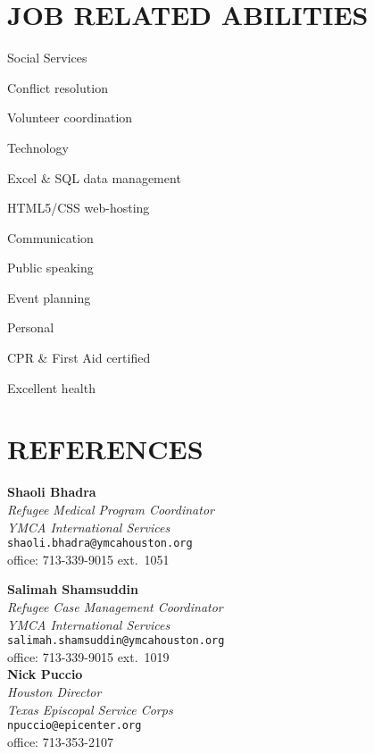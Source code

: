 \documentclass[margin]{res}
\newcommand\reference[5]{\textbf{#1}\\\emph{#2}\\#5\\#3\\}
\begin{document}
\begin{resume}
\section{JOB RELATED ABILITIES} \vspace{0pt}
	\begin{multicols}{2}
		\parskip=0pt
		\begin{skill}{Social Services}
			\item Conflict resolution
			\item Volunteer coordination
		\end{skill}
		\begin{skill}{Technology}
			\item Excel \& SQL data management
			\item HTML5/CSS web-hosting
		\end{skill}
		\begin{skill}{Communication}
			\item Public speaking
			\item Event planning
		\end{skill}
		\begin{skill}{Personal}
			\item CPR \& First Aid certified
			\item Excellent health
		\end{skill}
	\end{multicols}

\section{REFERENCES} 
		\reference{Shaoli Bhadra}{Refugee Medical Program Coordinator\\YMCA International Services}{office: 713-339-9015 ext.\ 1051}{cell: 704-651-3610}{\texttt{shaoli.bhadra@ymcahouston.org}}
		\parskip=0pt

		\reference{Salimah Shamsuddin}{Refugee Case Management Coordinator\\YMCA International Services}{office: 713-339-9015 ext.\ 1019}{cell: 205-585-0362}{\texttt{salimah.shamsuddin@ymcahouston.org}}
		
		
		\reference{Nick Puccio}{Houston Director\\Texas Episcopal Service Corps}{office: 713-353-2107}{cell: 713-497-7969}{\texttt{npuccio@epicenter.org}}

\end{resume}
\end{document}
